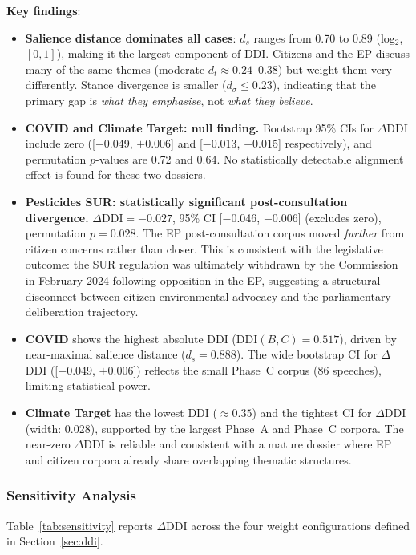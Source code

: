 \documentclass[sigconf,natbib]{acmart}
\begin{document}
\textbf{Key findings}:
\begin{itemize}
  \item \textbf{Salience distance dominates all cases}: $d_s$ ranges from 0.70 to 0.89
        (log$_2$, $[0,1]$), making it the largest component of DDI. Citizens and the EP
        discuss many of the same themes (moderate $d_t \approx 0.24$--$0.38$) but weight
        them very differently. Stance divergence is smaller ($d_\sigma \leq 0.23$),
        indicating that the primary gap is \textit{what they emphasise}, not \textit{what they believe}.

  \item \textbf{COVID and Climate Target: null finding.}
        Bootstrap 95\% CIs for $\Delta$DDI include zero
        ([$-$0.049, $+$0.006] and [$-$0.013, $+$0.015] respectively),
        and permutation $p$-values are 0.72 and 0.64.
        No statistically detectable alignment effect is found for these two dossiers.

  \item \textbf{Pesticides SUR: statistically significant post-consultation divergence.}
        $\Delta\text{DDI} = -0.027$, 95\% CI [$-$0.046, $-$0.006] (excludes zero),
        permutation $p = 0.028$.
        The EP post-consultation corpus moved \emph{further} from citizen concerns
        rather than closer. This is consistent with the legislative outcome:
        the SUR regulation was ultimately withdrawn by the Commission in February 2024
        following opposition in the EP, suggesting a structural disconnect between
        citizen environmental advocacy and the parliamentary deliberation trajectory.

  \item \textbf{COVID} shows the highest absolute DDI ($\text{DDI}(B,C) = 0.517$),
        driven by near-maximal salience distance ($d_s = 0.888$).
        The wide bootstrap CI for $\Delta$DDI ([$-$0.049, $+$0.006]) reflects
        the small Phase~C corpus (86 speeches), limiting statistical power.

  \item \textbf{Climate Target} has the lowest DDI ($\approx 0.35$) and the
        tightest CI for $\Delta$DDI (width: 0.028), supported by the largest
        Phase~A and Phase~C corpora. The near-zero $\Delta$DDI is reliable
        and consistent with a mature dossier where EP and citizen corpora
        already share overlapping thematic structures.
\end{itemize}

\subsubsection{Sensitivity Analysis}
Table~\ref{tab:sensitivity} reports $\Delta$DDI across the four weight configurations
defined in Section~\ref{sec:ddi}.
\end{document}
